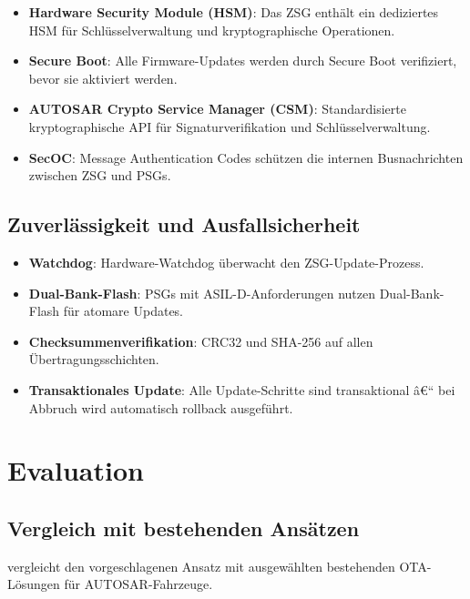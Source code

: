 ﻿\documentclass[12pt,a4paper,twoside]{article}
\begin{document}
\begin{itemize}
  \item \textbf{Hardware Security Module (HSM)}: Das ZSG enthält ein
    dediziertes HSM für Schlüsselverwaltung und kryptographische Operationen.
  \item \textbf{Secure Boot}: Alle Firmware-Updates werden durch Secure Boot
    verifiziert, bevor sie aktiviert werden.
  \item \textbf{AUTOSAR Crypto Service Manager (CSM)}: Standardisierte
    kryptographische API für Signaturverifikation und Schlüsselverwaltung.
  \item \textbf{SecOC}: Message Authentication Codes schützen die
    internen Busnachrichten zwischen ZSG und PSGs.
\end{itemize}

\subsection{Zuverlässigkeit und Ausfallsicherheit}

\begin{itemize}
  \item \textbf{Watchdog}: Hardware-Watchdog überwacht den ZSG-Update-Prozess.
  \item \textbf{Dual-Bank-Flash}: PSGs mit ASIL-D-Anforderungen nutzen
    Dual-Bank-Flash für atomare Updates.
  \item \textbf{Checksummenverifikation}: CRC32 und SHA-256 auf allen
    Übertragungsschichten.
  \item \textbf{Transaktionales Update}: Alle Update-Schritte sind
    transaktional â€“ bei Abbruch wird automatisch rollback ausgeführt.
\end{itemize}


\section{Evaluation}
\label{sec:evaluation}


\subsection{Vergleich mit bestehenden Ansätzen}

 vergleicht den vorgeschlagenen Ansatz mit
ausgewählten bestehenden OTA-Lösungen für AUTOSAR-Fahrzeuge.
\end{document}
